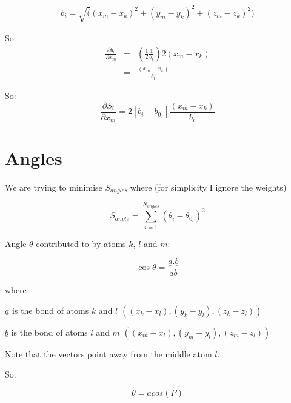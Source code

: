 \begin{displaymath}
  b_i = \sqrt((x_m-x_k)^2 + (y_m-y_k)^2 + (z_m-z_k)^2)
\end{displaymath}

So: 
\begin{eqnarray*}
\frac{\partial b_i}{\partial x_m} & = & (\frac{1}{2} \frac{1}{b_i}) 2 (x_m - x_k) \\
 &   = & \frac{(x_m - x_k)}{b_i}
\end{eqnarray*}

So: 
\begin{displaymath}
  \frac{\partial S_i}{\partial x_m} = 2[b_i - b_{0_1}] \frac{(x_m - x_k)}{b_i}
\end{displaymath}



\section{Angles}
We are trying to minimise $S_{angle}$, where (for simplicity I ignore
the weights)

\begin{displaymath}
  S_{angle} = \sum_{i=1}^{N_{angles}} {(\theta_i - \theta_{0_i})^2}
\end{displaymath}


Angle $\theta$ contributed to by atoms $k$, $l$ and $m$:

\begin{displaymath}
  \cos \theta = \frac{{\underline a}.{\underline b}}{ab}
\end{displaymath}

\begin{trivlist}
\item where
\item $\underline {a}$ is the bond of atoms $k$ and $l$ $((x_k-x_l), (y_k-y_l), (z_k-z_l))$
\item $\underline {b}$ is the bond of atoms $l$ and $m$  $((x_m-x_l), (y_m-y_l), (z_m-z_l))$
\item Note that the vectors point away from the middle atom $l$.
\end{trivlist}



So: 

\begin{equation}
  \label{eq:1}
  \theta = acos(P)
\end{equation}


